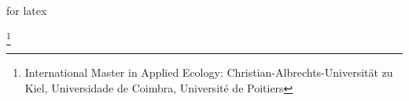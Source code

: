 for latex



\makeatletter
\let\@fnsymbol\@arabic
\makeatother

\thanks{International Master in Applied Ecology: Christian-Albrechts-Universit\"{a}t zu Kiel, Universidade de Coimbra, Universit\'{e} de Poitiers}
